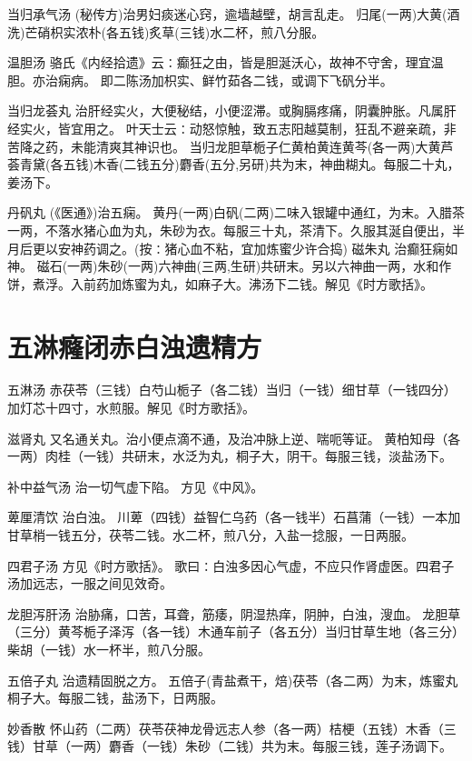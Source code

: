 \documentclass[a4paper,12pt,UTF8,twoside]{ctexbook}
\begin{document}
	当归承气汤
	(秘传方)治男妇痰迷心窍，逾墙越壁，胡言乱走。
	归尾(一两)大黄(酒洗)芒硝枳实浓朴(各五钱)炙草(三钱)水二杯，煎八分服。
	
	温胆汤
	骆氏《内经拾遗》云∶癫狂之由，皆是胆涎沃心，故神不守舍，理宜温胆。亦治痫病。
	即二陈汤加枳实、鲜竹茹各二钱，或调下飞矾分半。
	
	当归龙荟丸
	治肝经实火，大便秘结，小便涩滞。或胸膈疼痛，阴囊肿胀。凡属肝经实火，皆宜用之。
	叶天士云∶动怒惊触，致五志阳越莫制，狂乱不避亲疏，非苦降之药，未能清爽其神识也。
	当归龙胆草栀子仁黄柏黄连黄芩(各一两)大黄芦荟青黛(各五钱)木香(二钱五分)麝香(五分,另研)共为末，神曲糊丸。每服二十丸，姜汤下。
	
	丹矾丸
	(《医通》)治五痫。
	黄丹(一两)白矾(二两)二味入银罐中通红，为末。入腊茶一两，不落水猪心血为丸，朱砂为衣。每服三十丸，茶清下。久服其涎自便出，半月后更以安神药调之。(按∶猪心血不粘，宜加炼蜜少许合捣)
	磁朱丸
	治癫狂痫如神。
	磁石(一两)朱砂(一两)六神曲(三两,生研)共研末。另以六神曲一两，水和作饼，煮浮。入前药加炼蜜为丸，如麻子大。沸汤下二钱。解见《时方歌括》。
	
	\chapter{五淋癃闭赤白浊遗精方}
	五淋汤
	赤茯苓（三钱）白芍山栀子（各二钱）当归（一钱）细甘草（一钱四分）加灯芯十四寸，水煎服。解见《时方歌括》。
	
	滋肾丸
	又名通关丸。治小便点滴不通，及治冲脉上逆、喘呃等证。
	黄柏知母（各一两）肉桂（一钱）共研末，水泛为丸，桐子大，阴干。每服三钱，淡盐汤下。
	
	补中益气汤
	治一切气虚下陷。
	方见《中风》。
	
	萆厘清饮
	治白浊。
	川萆（四钱）益智仁乌药（各一钱半）石菖蒲（一钱）一本加甘草梢一钱五分，茯苓二钱。水二杯，煎八分，入盐一捻服，一日两服。
	
	四君子汤
	方见《时方歌括》。
	歌曰∶白浊多因心气虚，不应只作肾虚医。四君子汤加远志，一服之间见效奇。
	
	龙胆泻肝汤
	治胁痛，口苦，耳聋，筋痿，阴湿热痒，阴肿，白浊，溲血。
	龙胆草（三分）黄芩栀子泽泻（各一钱）木通车前子（各五分）当归甘草生地（各三分）柴胡（一钱）水一杯半，煎八分服。
	
	五倍子丸
	治遗精固脱之方。
	五倍子(青盐煮干，焙)茯苓（各二两）为末，炼蜜丸桐子大。每服二钱，盐汤下，日两服。
	
	妙香散
	怀山药（二两）茯苓茯神龙骨远志人参（各一两）桔梗（五钱）木香（三钱）甘草（一两）麝香（一钱）朱砂（二钱）共为末。每服三钱，莲子汤调下。
	
\end{document}
